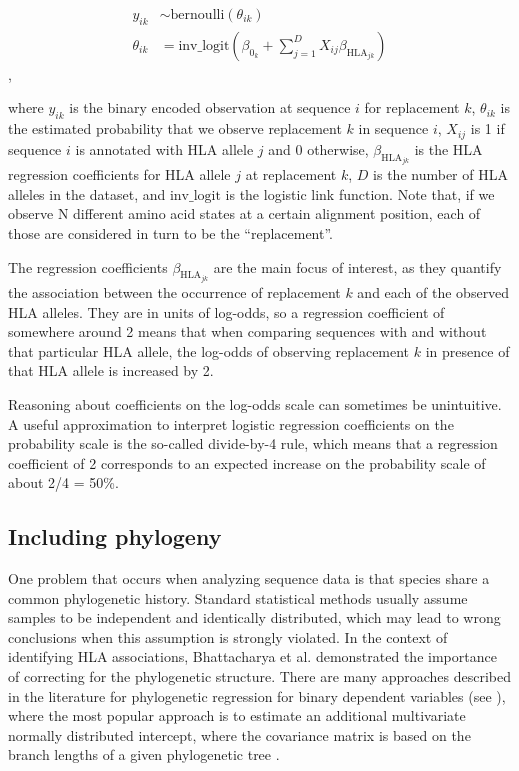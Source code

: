 \documentclass[fleqn,11pt]{SelfArx} %
\begin{document}
\begin{align}
  y_{ik} & \sim \text{bernoulli}(\theta_{ik}) \\
  \theta_{ik} & = \text{inv\_logit}(\beta_{0_{k}} + \sum_{j=1}^{D} X_{ij}\beta_{\text{HLA}_{jk}})
\end{align}, 

where \(y_{ik}\) is the binary encoded observation at sequence \(i\) for replacement \(k\), \(\theta_{ik}\) is the estimated probability that we observe replacement \(k\) in sequence \(i\), \(X_{ij}\) is 1 if sequence \(i\) is annotated with HLA allele \(j\) and 0 otherwise, \(\beta_{\text{HLA}_{jk}}\) is the HLA regression coefficients for HLA allele \(j\) at replacement \(k\), \(D\) is the number of HLA alleles in the dataset, and \(\text{inv\_logit}\) is the logistic link function. Note that, if we observe N different amino acid states at a certain alignment position, each of those are considered in turn to be the “replacement”.

The regression coefficients \(\beta_{\text{HLA}_{jk}}\) are the main focus of interest, as they quantify the association between the occurrence of replacement \(k\) and each of the observed HLA alleles. They are in units of log-odds, so a regression coefficient of somewhere around 2 means that when comparing sequences with and without that particular HLA allele, the log-odds of observing replacement \(k\) in presence of that HLA allele is increased by 2.

Reasoning about coefficients on the log-odds scale can sometimes be unintuitive. A useful approximation to interpret logistic regression coefficients on the probability scale is the so-called divide-by-4 rule, which means that a regression coefficient of 2 corresponds to an expected increase on the probability scale of about 2/4 = 50\%. 

\subsection*{Including phylogeny}

One problem that occurs when analyzing sequence data is that species share a common phylogenetic history. Standard statistical methods usually assume samples to be independent and identically distributed, which may lead to wrong conclusions when this assumption is strongly violated.
In the context of identifying HLA associations, Bhattacharya et al.\cite{Bhattacharya2007} demonstrated the importance of correcting for the phylogenetic structure.
There are many approaches described in the literature for phylogenetic regression for binary dependent variables (see \cite{Ives2014}), where the most popular approach is to estimate an additional multivariate normally distributed intercept, where the covariance matrix is based on the branch lengths of a given phylogenetic tree \cite{Ives2009}.
\end{document}
